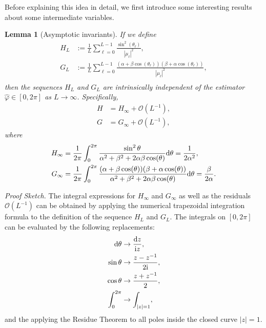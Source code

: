 \documentclass[a4paper,12pt]{article}
\newtheorem{lemma}{\bf Lemma}
\def \ri {{\rm i}}
\def \d {{\rm d}}
\begin{document}
Before explaining this idea in detail, we first introduce some interesting results about some intermediate variables.
\begin{lemma}[Asymptotic invariants]\label{lemma:asymp_inv}
    If we define 
    \begin{equation}
        \begin{aligned}
            H_L & :=\frac{1}{L}\sum_{\ell=0}^{L-1} \frac{\sin^2(\theta_\ell)}{|\mu_\ell|^2}, \\
            G_L & := \frac{1}{L}\sum_{\ell=0}^{L-1} \frac{(\alpha+\beta \cos(\theta_\ell))(\beta+\alpha\cos(\theta_\ell))}{|\mu_\ell|^2}, \\
        \end{aligned}
    \end{equation}
    then the sequences $H_L$ and $G_L$ are intrinsically independent of the estimator $\hat{\varphi}\in[0,2\pi]$ as $L\to\infty$. Specifically, 
    \begin{equation}
        \begin{aligned}
            H &= H_{\infty} + \mathcal{O}(L^{-1}), \\
            G &= G_{\infty} + \mathcal{O}(L^{-1}), 
        \end{aligned}
    \end{equation}
    where 
    \begin{equation}
        \begin{aligned}
            H_{\infty} &=  \frac{1}{2\pi}\int_{0}^{2\pi} \frac{\sin^2\theta}{\alpha^2+\beta^2+2\alpha\beta\cos(\theta)}{\rm d}\theta = \frac{1}{2\alpha^2},  \\
            G_{\infty} &= \frac{1}{2\pi}\int_{0}^{2\pi} \frac{(\alpha+\beta\cos(\theta))(\beta+\alpha\cos(\theta))}{\alpha^2+\beta^2+2\alpha\beta\cos(\theta)} {\rm d}\theta = \frac{\beta}{2\alpha}.  \\ 
        \end{aligned}
    \end{equation}
\end{lemma}

{\it Proof Sketch.} The integral expressions for $H_\infty$ and $G_\infty$ as well as the residuals $\mathcal{O}(L^{-1})$ can be obtained by applying the numerical trapezoidal integration formula to the definition of the sequence $H_L$ and $G_L$. The integrals on $[0,2\pi]$ can be evaluated by the following replacements:
\begin{equation}
    \begin{aligned}
        {\rm d}\theta & \to \frac{\d z}{\ri z}, \\
        \sin\theta & \to \frac{z-z^{-1}}{2\ri}, \\
        \cos\theta & \to \frac{z+z^{-1}}{2}, \\
        \int_0^{2\pi} & \to \int_{|z|=1}, \\
    \end{aligned}
\end{equation}
and the applying the Residue Theorem to all poles inside the closed curve $|z|=1$. 
\end{document}
